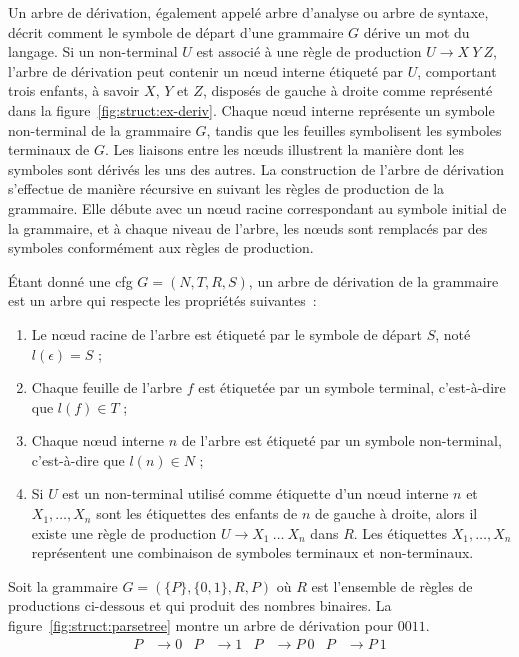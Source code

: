 Un arbre de dérivation, également appelé arbre d'analyse ou arbre de syntaxe, décrit comment le symbole de départ d'une grammaire $G$ dérive un mot du langage.
Si un non-terminal $U$ est associé à une règle de production $U \to X ~ Y ~ Z$, l'arbre de dérivation peut contenir un nœud interne étiqueté par $U$, comportant trois enfants, à savoir $X$, $Y$ et $Z$, disposés de gauche à droite comme représenté dans la figure~\ref{fig:struct:ex-deriv}.
Chaque nœud interne représente un symbole non-terminal de la grammaire $G$, tandis que les feuilles symbolisent les symboles terminaux de $G$.
Les liaisons entre les nœuds illustrent la manière dont les symboles sont dérivés les uns des autres.
La construction de l'arbre de dérivation s'effectue de manière récursive en suivant les règles de production de la grammaire. Elle débute avec un nœud racine correspondant au symbole initial de la grammaire, et à chaque niveau de l'arbre, les nœuds sont remplacés par des symboles conformément aux règles de production.

\begin{definition}
    Étant donné une \gls{cfg} $G = (N, T, R, S)$, un arbre de dérivation de la grammaire est un arbre qui respecte les propriétés suivantes :
    \begin{enumerate}
        \item Le nœud racine de l'arbre est étiqueté par le symbole de départ $S$, noté $l(\epsilon) = S$ ;
        \item Chaque feuille de l'arbre $f$ est étiquetée par un symbole terminal, c'est-à-dire que $l(f) \in T$ ;
        \item Chaque nœud interne $n$ de l'arbre est étiqueté par un symbole non-terminal, c'est-à-dire que $l(n) \in N$ ;
        \item Si $U$ est un non-terminal utilisé comme étiquette d'un nœud interne $n$ et $X_1, \dots, X_n$ sont les étiquettes des enfants de $n$ de gauche à droite, alors il existe une règle de production $U \to X_1 ~ \dots ~ X_n$ dans $R$.
              Les étiquettes $X_1, \dots, X_n$ représentent une combinaison de symboles terminaux et non-terminaux.
    \end{enumerate}
\end{definition}

\begin{example}
    \label{ex:struct:cfg}
    Soit la grammaire $G = (\{P\}, \{0,1\}, R, P)$ où $R$ est l'ensemble de règles de productions ci-dessous et qui produit des nombres binaires.
    La figure~\ref{fig:struct:parsetree} montre un arbre de dérivation pour $0011$.
    \begin{align*}
        P & \to 0 & P & \to 1 & P & \to P~0 & P & \to P~1
    \end{align*}
\end{example}

